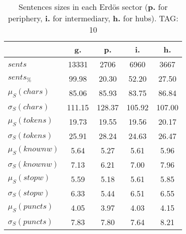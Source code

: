 \begin{table}[h!]
\begin{center}
\begin{tabular}{| l || c | c | c | c |}\hline
 & {\bf g.} & {\bf p.} & {\bf i.} & {\bf h.} \\\hline\hline
$sents$ & 13331  & 2706  & 6960  & 3667 \\
$sents_{\%}$ & 99.98  & 20.30  & 52.20  & 27.50 \\\hline
$\mu_S(chars)$ & 85.06  & 85.93  & 83.75  & 86.84 \\
$\sigma_S(chars)$ & 111.15  & 128.37  & 105.92  & 107.00 \\\hline
$\mu_S(tokens)$ & 19.73  & 19.55  & 19.56  & 20.17 \\
$\sigma_S(tokens)$ & 25.91  & 28.24  & 24.63  & 26.47 \\\hline
$\mu_S(knownw)$ & 5.64  & 5.27  & 5.61  & 5.96 \\
$\sigma_S(knownw)$ & 7.13  & 6.21  & 7.00  & 7.96 \\\hline
$\mu_S(stopw)$ & 5.59  & 5.18  & 5.61  & 5.85 \\
$\sigma_S(stopw)$ & 6.33  & 5.44  & 6.51  & 6.55 \\\hline
$\mu_S(puncts)$ & 4.05  & 3.97  & 4.03  & 4.15 \\
$\sigma_S(puncts)$ & 7.83  & 7.80  & 7.64  & 8.21 \\\hline
\end{tabular}
\caption{Sentences sizes in each Erd\"os sector ({{\bf p.}} for periphery, {{\bf i.}} for intermediary, {{\bf h.}} for hubs). TAG: 10}
\end{center}
\end{table}